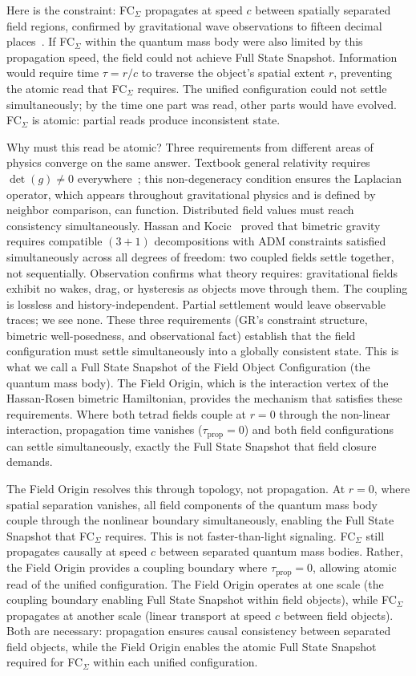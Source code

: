 \documentclass[aps,prd,preprint,superscriptaddress,showpacs,preprintnumbers,amsmath,amssymb,nofootinbib]{revtex4-2}
\begin{document}
Here is the constraint: FC$_{\Sigma}$ propagates at speed $c$ between spatially separated field regions, confirmed by gravitational wave observations to fifteen decimal places~\cite{gw170817}. If FC$_{\Sigma}$ within the quantum mass body were also limited by this propagation speed, the field could not achieve Full State Snapshot. Information would require time $\tau = r/c$ to traverse the object's spatial extent $r$, preventing the atomic read that FC$_{\Sigma}$ requires. The unified configuration could not settle simultaneously; by the time one part was read, other parts would have evolved. FC$_{\Sigma}$ is atomic: partial reads produce inconsistent state.

Why must this read be atomic? Three requirements from different areas of physics converge on the same answer. Textbook general relativity requires $\det(g) \neq 0$ everywhere~\cite{mtw1973,wald1984}; this non-degeneracy condition ensures the Laplacian operator, which appears throughout gravitational physics and is defined by neighbor comparison, can function. Distributed field values must reach consistency simultaneously. Hassan and Kocic~\cite{hassankocic2018} proved that bimetric gravity requires compatible $(3{+}1)$ decompositions with ADM constraints satisfied simultaneously across all degrees of freedom: two coupled fields settle together, not sequentially. Observation confirms what theory requires: gravitational fields exhibit no wakes, drag, or hysteresis as objects move through them. The coupling is lossless and history-independent. Partial settlement would leave observable traces; we see none. These three requirements (GR's constraint structure, bimetric well-posedness, and observational fact) establish that the field configuration must settle simultaneously into a globally consistent state. This is what we call a Full State Snapshot of the Field Object Configuration (the quantum mass body). The Field Origin, which is the interaction vertex of the Hassan-Rosen bimetric Hamiltonian, provides the mechanism that satisfies these requirements. Where both tetrad fields couple at $r = 0$ through the non-linear interaction, propagation time vanishes ($\tau_{\text{prop}} = 0$) and both field configurations can settle simultaneously, exactly the Full State Snapshot that field closure demands.

The Field Origin resolves this through topology, not propagation. At $r = 0$, where spatial separation vanishes, all field components of the quantum mass body couple through the nonlinear boundary simultaneously, enabling the Full State Snapshot that FC$_{\Sigma}$ requires. This is not faster-than-light signaling. FC$_{\Sigma}$ still propagates causally at speed $c$ between separated quantum mass bodies. Rather, the Field Origin provides a coupling boundary where $\tau_{\text{prop}} = 0$, allowing atomic read of the unified configuration. The Field Origin operates at one scale (the coupling boundary enabling Full State Snapshot within field objects), while FC$_{\Sigma}$ propagates at another scale (linear transport at speed $c$ between field objects). Both are necessary: propagation ensures causal consistency between separated field objects, while the Field Origin enables the atomic Full State Snapshot required for FC$_{\Sigma}$ within each unified configuration.
\end{document}
